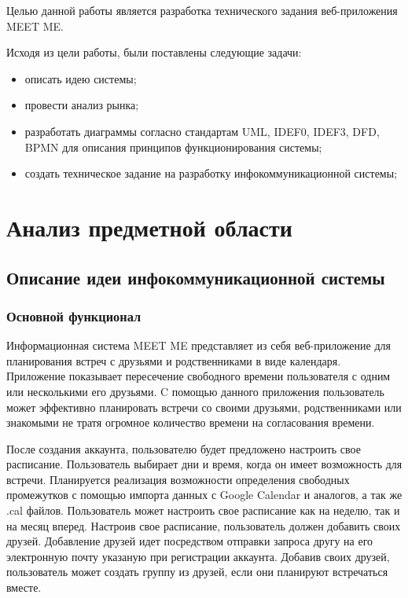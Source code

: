 \documentclass[14pt]{extreport}
\begin{document}
Целью данной работы является разработка технического задания веб-приложения MEET ME. 

Исходя из цели работы, были поставлены следующие задачи:
\begin{itemize}
    \item описать идею системы;
    \item провести анализ рынка;
    \item разработать диаграммы согласно стандартам UML, IDEF0, IDEF3, DFD, BPMN для описания принципов функционирования системы;
    \item создать техническое задание на разработку инфокоммуникационной системы;
\end{itemize}








\chapter{Анализ предметной области}


    \section{Описание идеи инфокоммуникационной системы \label{chapter1}}

        \subsection{Основной функционал }

        Информационная система MEET ME представляет из себя веб-приложение для планирования встреч с друзьями и родственниками в виде календаря. 
        Приложение показывает пересечение свободного времени пользователя с одним или несколькими его друзьями.
        C помощью данного приложения пользователь может эффективно планировать встречи со своими друзьями, родственниками или знакомыми не тратя огромное количество времени на согласования времени. 

        После создания аккаунта, пользователю будет предложено настроить свое расписание. Пользователь выбирает дни и время, когда он имеет возможность для встречи. Планируется реализация возможности определения свободных промежутков с помощью импорта данных с Google Calendar и аналогов, а так же .cal файлов.
        Пользователь может настроить свое расписание как на неделю, так и на месяц вперед. Настроив свое расписание, пользователь должен добавить своих друзей.  Добавление друзей идет посредством отправки запроса другу на его электронную почту указаную при регистрации аккаунта. Добавив своих друзей, пользователь может создать группу из друзей, если они планируют встречаться вместе.
\end{document}
